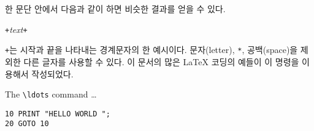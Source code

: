 한 문단 안에서 다음과 같이 하면 비슷한 결과를 얻을 수 있다.
\begin{lscommand}
\verb|+|\emph{text}\verb|+|
\end{lscommand}
\noindent \verb|+|는 시작과 끝을 나타내는 경계문자의 한 예시이다. 문자(letter), \verb|*|, 공백(space)을
제외한 다른 글자를 사용할 수 있다. 이 문서의 많은 \LaTeX{} 코딩의 예들이 이 명령을 이용해서 작성되었다.



\begin{example}
The \verb|\ldots| command \ldots

\begin{verbatim}
10 PRINT "HELLO WORLD ";
20 GOTO 10
\end{verbatim}
\end{example}

\vspace{-.5\onelineskip}

